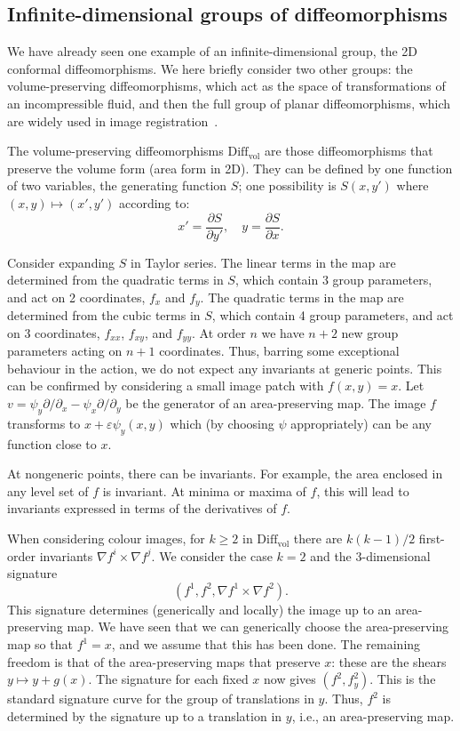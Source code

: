 \documentclass[review,onefignum,onetabnum]{siamonline190516}
\begin{document}
\subsection{Infinite-dimensional groups of diffeomorphisms}

We have already seen one example of an infinite-dimensional group, the 2D conformal diffeomorphisms. We here briefly consider two other groups: the volume-preserving diffeomorphisms, which act as the space of transformations of an incompressible fluid, and then the full group of planar diffeomorphisms, which are widely used in image registration~\cite{YounesBook}.

The volume-preserving diffeomorphisms $\mathrm{Diff}_{\mathrm{vol}}$ are those diffeomorphisms that preserve the volume form (area form in 2D). They can be defined by one function of two variables, the generating function $S$; one possibility is $S(x,y')$ where $(x,y)\mapsto(x',y')$ according to:
$$ x'=\frac{\partial S}{\partial y'},\quad y = \frac{\partial S}{\partial x}.$$

Consider expanding $S$ in Taylor series. The linear terms in the map are determined from the quadratic terms in $S$, which contain 3 group parameters, and act on 2 coordinates, $f_x$ and $f_y$.  The quadratic terms in the map are determined from the cubic terms in $S$, which contain 4 group parameters, and act on 3 coordinates, $f_{xx}$, $f_{xy}$, and $f_{yy}$. At order $n$ we have $n+2$ new group parameters acting on $n+1$ coordinates. Thus, barring some exceptional behaviour in the action, we do not expect any invariants at generic points. This can be confirmed by considering a small image patch with $f(x,y)=x.$ Let $v=\psi_y\partial/\partial_x - \psi_x\partial/\partial_y$ be the generator of an area-preserving map. The image $f$ transforms to $x + \varepsilon \psi_y(x,y)$ which (by choosing $\psi$ appropriately) can be any function close to $x$.

At nongeneric points, there can be invariants. For example, the area enclosed in any level set of $f$ is invariant. At minima or maxima of $f$, this will lead to invariants expressed in terms of the derivatives of $f$.

When considering colour images, for $k\ge 2$ in $\mathrm{Diff}_{\mathrm{vol}}$ there are $k(k-1)/2$ first-order invariants $ \nabla f^i \times \nabla f^j$.  We consider the case $k=2$ and the 3-dimensional signature $$ (f^1,f^2, \nabla f^1 \times \nabla f^2).$$ This signature determines (generically and locally) the image up to an area-preserving map.  We have seen that we can generically choose the area-preserving map so that $f^1=x$, and we assume that this has been done. The remaining freedom is that of the area-preserving maps that preserve $x$: these are the shears $y\mapsto y + g(x)$. The signature for each fixed $x$ now gives $(f^2,f^2_y)$. This is the standard signature curve for the group of translations in $y$. Thus, $f^2$ is determined by the signature up to a translation in $y$, i.e., an area-preserving map.
\end{document}
